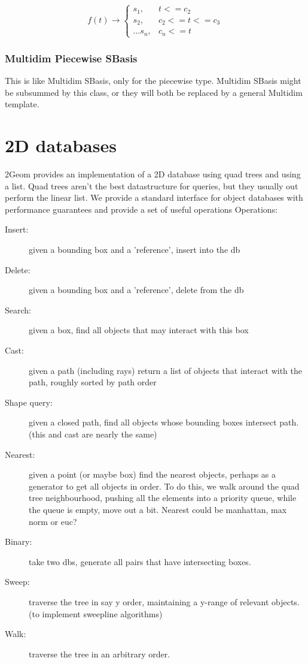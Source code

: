 \documentclass{book}
\begin{document}
$$
f(t) \rightarrow \left\{ 
\begin{array}{cc}
s_1,& t <= c_2 \\
s_2,& c_2 <= t <= c_3\\
\ldots
s_n,& c_n <= t
\end{array}\right.
$$

\subsection{Multidim Piecewise SBasis}
This is like Multidim SBasis, only for the piecewise type.  Multidim
SBasis might be subsummed by this class, or they will both be replaced
by a general Multidim template.

\chapter{2D databases}

2Geom provides an implementation of a 2D database using quad trees and
using a list.  Quad trees aren't the best datastructure for queries,
but they usually out perform the linear list.  We provide a
standard interface for object databases with performance guarantees
and provide a set of useful operations Operations:

\begin{description}
\item[Insert:] given a bounding box and a 'reference', insert into the db
\item[Delete:] given a bounding box and a 'reference', delete from the db
\item[Search:] given a box, find all objects that may interact with this box
\item[Cast:] given a path (including rays) return a list of objects that interact with the path, roughly sorted by path order
\item[Shape query:] given a closed path, find all objects whose bounding boxes intersect path.  (this and cast are nearly the same)
\item[Nearest:] given a point (or maybe box) find the nearest objects, perhaps as a generator to get all objects in order.  To do this, we walk around the quad tree neighbourhood, pushing all the elements into a priority queue, while the queue is empty, move out a bit.  Nearest could be manhattan, max norm or euc?
\item[Binary:] take two dbs, generate all pairs that have intersecting boxes.
\item[Sweep:] traverse the tree in say y order, maintaining a y-range of relevant objects. (to implement sweepline algorithms)
\item[Walk:] traverse the tree in an arbitrary order.
\end{description}
\end{document}
